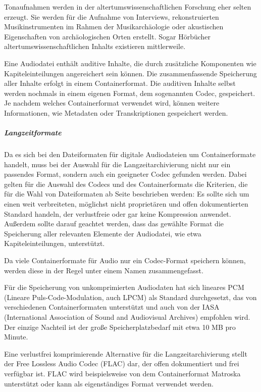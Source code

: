 Tonaufnahmen werden in der altertumswissenschaftlichen Forschung eher selten erzeugt. Sie werden für die Aufnahme von Interviews, rekonstruierten Musikinstrumenten im Rahmen der Musikarchäologie oder akustischen Eigenschaften von archäologischen Orten erstellt. Sogar Hörbücher altertumswissenschaftlichen Inhalts existieren mittlerweile.

Eine Audiodatei enthält auditive Inhalte, die durch zusätzliche Komponenten wie Kapiteleinteilungen angereichert sein können. Die zusammenfassende Speicherung aller Inhalte erfolgt in einem Containerformat. Die auditiven Inhalte selbst werden nochmals in einem eigenen Format, dem sogenannten Codec, gespeichert. Je nachdem welches Containerformat verwendet wird, können weitere Informationen, wie Metadaten oder Transkriptionen gespeichert werden.


\subparagraph{Langzeitformate} Da es sich bei den Dateiformaten für digitale Audiodateien um Containerformate handelt, muss bei der Auswahl für die Langzeitarchivierung nicht nur ein passendes Format, sondern auch ein geeigneter Codec gefunden werden. Dabei gelten für die Auswahl des Codecs und des Containerformats die Kriterien, die für die Wahl von Dateiformaten ab Seite \pageref{dateiformate} beschrieben werden: Es sollte sich um einen weit verbreiteten, möglichst nicht proprietären und offen dokumentierten Standard handeln, der verlustfreie oder gar keine Kompression anwendet. Außerdem sollte darauf geachtet werden, dass das gewählte Format die Speicherung aller relevanten Elemente der Audiodatei, wie etwa Kapiteleinteilungen, unterstützt.

Da viele Containerformate für Audio nur ein Codec-Format speichern können, werden diese in der Regel unter einem Namen zusammengefasst.

Für die Speicherung von unkomprimierten Audiodaten hat sich lineares PCM (Lineare Puls-Code-Modulation, auch LPCM) als Standard durchgesetzt, das von verschiedenen Containerformaten unterstützt und auch von der IASA (International Association of Sound and Audiovisual Archives) empfohlen wird. Der einzige Nachteil ist der große Speicherplatzbedarf mit etwa 10 MB pro Minute.

Eine verlustfrei komprimierende Alternative für die Langzeitarchivierung stellt der Free Lossless Audio Codec (FLAC) dar, der offen dokumentiert und frei verfügbar ist. FLAC wird beispielsweise von dem Containerformat Matroska unterstützt oder kann als eigenständiges Format verwendet werden. 

